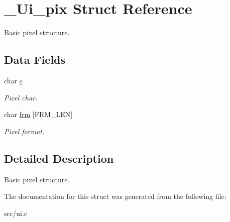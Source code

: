 \hypertarget{struct__Ui__pix}{}\section{\+\_\+\+Ui\+\_\+pix Struct Reference}
\label{struct__Ui__pix}


Basic pixel structure.  


\subsection*{Data Fields}
\begin{DoxyCompactItemize}
\item 
\mbox{\label{struct__Ui__pix_aa12b962b28524e2f295d0fd90b9595a8}} 
char \hyperlink{struct__Ui__pix_aa12b962b28524e2f295d0fd90b9595a8}{c}
\begin{DoxyCompactList}\small\item\em Pixel char. \end{DoxyCompactList}\item 
\mbox{\label{struct__Ui__pix_a0e503eb95fbe667b3c97e39dbad54649}} 
char \hyperlink{struct__Ui__pix_a0e503eb95fbe667b3c97e39dbad54649}{frm} \mbox{[}F\+R\+M\+\_\+\+L\+EN\mbox{]}
\begin{DoxyCompactList}\small\item\em Pixel format. \end{DoxyCompactList}\end{DoxyCompactItemize}


\subsection{Detailed Description}
Basic pixel structure. 

The documentation for this struct was generated from the following file\+:\begin{DoxyCompactItemize}
\item 
src/ui.\+c\end{DoxyCompactItemize}

